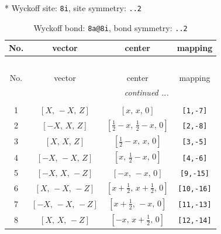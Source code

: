 \documentclass[fleqn,8pt]{jsarticle}
\begin{document}
* Wyckoff site: {\tt 8i}, site symmetry: {\tt ..2}
\renewcommand{\arraystretch}{1.2}
\begin{longtable}{cccc}
\caption{Wyckoff bond: {\tt 8a@8i}, bond symmetry: {\tt ..2}}
 \\
 \hline \hline
No. & vector & center & mapping \\ \hline \endfirsthead

\multicolumn{3}{l}{\tablename\ \thetable{}} \\
 \hline \hline
No. & vector & center & mapping \\ \hline \endhead

 \hline \hline
\multicolumn{3}{r}{\footnotesize\it continued ...} \\ \endfoot

 \hline \hline
\multicolumn{3}{r}{} \\ \endlastfoot

1 & $\left[ X,\, - X,\, Z \right]$ & $\left[ x,\, x,\, 0 \right]$ & {\tt [1,-7]} \\ \hline
2 & $\left[ - X,\, X,\, Z \right]$ & $\left[ \frac{1}{2} - x,\, \frac{1}{2} - x,\, 0 \right]$ & {\tt [2,-8]} \\ \hline
3 & $\left[ X,\, X,\, Z \right]$ & $\left[ \frac{1}{2} - x,\, x,\, 0 \right]$ & {\tt [3,-5]} \\ \hline
4 & $\left[ - X,\, - X,\, Z \right]$ & $\left[ x,\, \frac{1}{2} - x,\, 0 \right]$ & {\tt [4,-6]} \\ \hline
5 & $\left[ - X,\, X,\, - Z \right]$ & $\left[ - x,\, - x,\, 0 \right]$ & {\tt [9,-15]} \\ \hline
6 & $\left[ X,\, - X,\, - Z \right]$ & $\left[ x + \frac{1}{2},\, x + \frac{1}{2},\, 0 \right]$ & {\tt [10,-16]} \\ \hline
7 & $\left[ - X,\, - X,\, - Z \right]$ & $\left[ x + \frac{1}{2},\, - x,\, 0 \right]$ & {\tt [11,-13]} \\ \hline
8 & $\left[ X,\, X,\, - Z \right]$ & $\left[ - x,\, x + \frac{1}{2},\, 0 \right]$ & {\tt [12,-14]} \\
\end{longtable}
\renewcommand{\arraystretch}{1.2}
\end{document}
